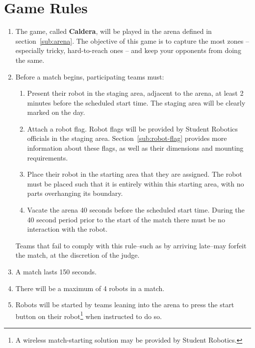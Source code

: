 \section {Game Rules}
\label{game-rules}

\begin{enumerate}
\item The game, called \textbf{Caldera}, will be played in the arena defined in section~\ref{sub:arena}.  The objective of this game is to capture the most zones -- especially tricky, hard-to-reach ones -- and keep your opponents from doing the same.

\item Before a match begins, participating teams must:
\begin {enumerate}
  \item Present their robot in the staging area, adjacent to the arena, at least 2 minutes before the scheduled start time.
        The staging area will be clearly marked on the day.

  \item Attach a robot flag.
        Robot flags will be provided by Student Robotics officials in the staging area.
        Section~\ref{sub:robot-flag} provides more information about these flags, as well as their dimensions and mounting requirements.

  \item Place their robot in the starting area that they are assigned.
        The robot must be placed such that it is entirely within this starting area, with no parts overhanging its boundary.

  \item Vacate the arena 40 seconds before the scheduled start time.
        During the 40 second period prior to the start of the match there must be no interaction with the robot.
\end{enumerate}
  Teams that fail to comply with this rule--such as by arriving late--may forfeit the match, at the discretion of the judge.

\item A match lasts 150 seconds.

\item There will be a maximum of 4 robots in a match.

\item Robots will be started by teams leaning into the arena to press the start button on their robot\footnote{A wireless match-starting solution may be provided by Student Robotics.} when instructed to do so.


\end{enumerate}
